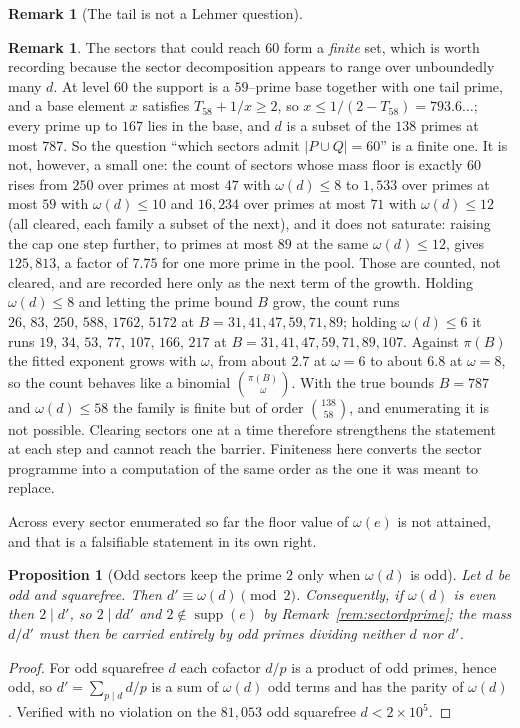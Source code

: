 \documentclass[11pt]{article}
\newtheorem{proposition}[theorem]{Proposition}
\theoremstyle{definition}
\newtheorem{remark}[theorem]{Remark}
\begin{document}
\begin{remark}[The tail is not a Lehmer question]
\begin{remark}
The sectors that could reach $60$ form a \emph{finite} set, which is worth recording because the sector decomposition appears to range over unboundedly many $d$. At level $60$ the
support is a $59$--prime base together with one tail prime, and a base element $x$ satisfies
$T_{58}+1/x\ge2$, so $x\le1/(2-T_{58})=793.6\ldots$; every prime up to $167$ lies in the base, and
$d$ is a subset of the $138$ primes at most $787$. So the question ``which sectors admit
$|P\cup Q|=60$'' is a finite one. It is not, however, a small one: the count of sectors whose mass
floor is exactly $60$ rises from $250$ over primes at most $47$ with $\omega(d)\le8$ to $1{,}533$
over primes at most $59$ with $\omega(d)\le10$ and $16{,}234$ over primes at most $71$ with
$\omega(d)\le12$ (all cleared, each family a subset of the next), and it does not saturate: raising the
cap one step further, to primes at most $89$ at the same $\omega(d)\le12$, gives $125{,}813$, a factor
of $7.75$ for one more prime in the pool. Those are counted, not cleared, and are recorded here only as
the next term of the growth. Holding $\omega(d)\le8$ and letting the prime bound $B$ grow, the
count runs $26,\,83,\,250,\,588,\,1762,\,5172$ at $B=31,41,47,59,71,89$; holding $\omega(d)\le6$ it
runs $19,\,34,\,53,\,77,\,107,\,166,\,217$ at $B=31,41,47,59,71,89,107$. Against $\pi(B)$ the fitted
exponent grows with $\omega$, from about $2.7$ at $\omega=6$ to about $6.8$ at $\omega=8$, so the count
behaves like a binomial $\binom{\pi(B)}{\omega}$. With the true bounds $B=787$ and $\omega(d)\le58$ the
family is finite but of order $\binom{138}{58}$, and enumerating it is not possible. Clearing sectors
one at a time therefore strengthens the statement at each step and cannot reach the barrier. Finiteness here converts the sector programme into a
computation of the same order as the one it was meant to replace.

Across every sector enumerated so far the floor value of $\omega(e)$ is not attained, and that is a
falsifiable statement in its own right.

\begin{proposition}[Odd sectors keep the prime $2$ only when $\omega(d)$ is odd]\label{prop:oddsector}
Let $d$ be odd and squarefree. Then $d'\equiv\omega(d)\pmod2$. Consequently, if $\omega(d)$ is even
then $2\mid d'$, so $2\mid dd'$ and $2\notin\operatorname{supp}(e)$ by
Remark~\ref{rem:sectordprime}; the mass $d/d'$ must then be carried entirely by odd primes dividing
neither $d$ nor $d'$.
\end{proposition}
\begin{proof}
For odd squarefree $d$ each cofactor $d/p$ is a product of odd primes, hence odd, so
$d'=\sum_{p\mid d}d/p$ is a sum of $\omega(d)$ odd terms and has the parity of $\omega(d)$. Verified
with no violation on the $81{,}053$ odd squarefree $d<2\times10^5$.
\end{proof}


\end{remark}
\end{remark}
\end{document}
